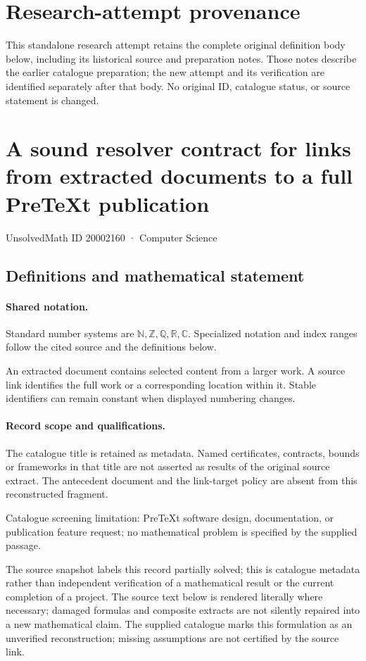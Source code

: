 \documentclass[11pt]{article}
\begin{document}
\section*{Research-attempt provenance}
This standalone research attempt retains the complete original definition body below,
including its historical source and preparation notes. Those notes describe the
earlier catalogue preparation; the new attempt and its verification are identified
separately after that body. No original ID, catalogue status, or source statement is changed.

\section{A sound resolver contract for links from extracted documents to a full PreTeXt publication}\label{20002160}
{\small UnsolvedMath ID 20002160 · Computer Science}
\subsection{Definitions and mathematical statement}

\paragraph{Shared notation.}Standard number systems are $\mathbb N,\mathbb Z,\mathbb Q,\mathbb R,\mathbb C$. Specialized notation and index ranges follow the cited source and the definitions below.


An extracted document contains selected content from a larger work. A source link identifies the full work or a corresponding location within it. Stable identifiers can remain constant when displayed numbering changes.
\paragraph{Record scope and qualifications.}
The catalogue title is retained as metadata. Named certificates, contracts, bounds or frameworks in that title are not asserted as results of the original source extract.
The antecedent document and the link-target policy are absent from this reconstructed fragment.

Catalogue screening limitation: PreTeXt software design, documentation, or publication feature request; no mathematical problem is specified by the supplied passage.

The source snapshot labels this record partially solved; this is catalogue metadata rather than independent verification of a mathematical result or the current completion of a project.
The source text below is rendered literally where necessary; damaged formulas and composite extracts are not silently repaired into a new mathematical claim.
The supplied catalogue marks this formulation as an unverified reconstruction; missing assumptions are not certified by the source link.
\end{document}
